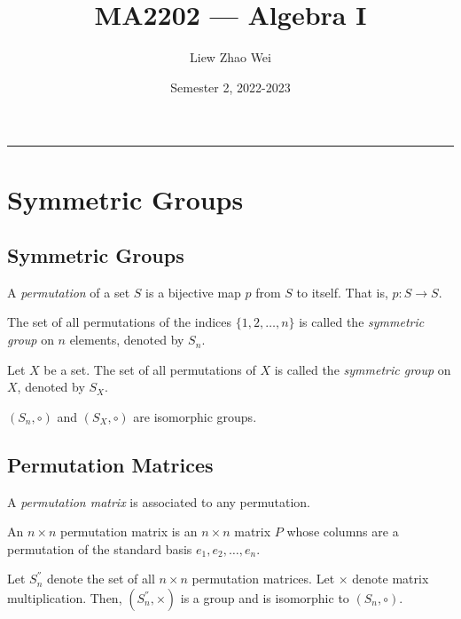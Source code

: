 \documentclass{article}
\title{MA2202 --- Algebra I}
\author{Liew Zhao Wei}
\date{Semester 2, 2022-2023}
\begin{document}
\maketitle
\hrule

\section{Symmetric Groups}

\subsection{Symmetric Groups}

\begin{definition}[Permutation]
  A \emph{permutation} of a set $S$ is a bijective map $p$ from $S$ to itself. That is, $p \colon S \to S$.
\end{definition}

\begin{definition}
  The set of all permutations of the indices $\{1, 2, \ldots, n\}$ is called the \emph{symmetric group} on $n$ elements, denoted by $S_n$.
\end{definition}

\begin{definition}
  Let $X$ be a set. The set of all permutations of $X$ is called the \emph{symmetric group} on $X$, denoted by $S_X$.
\end{definition}

\begin{proposition}
  $(S_n, \circ)$ and $(S_X, \circ)$ are isomorphic groups.
\end{proposition}

\subsection{Permutation Matrices}

A \emph{permutation matrix} is associated to any permutation.

\begin{definition}
  An $n \times n$ permutation matrix is an $n \times n$ matrix $P$ whose columns are a permutation of the standard basis $e_1, e_2, \ldots, e_n$.
\end{definition}

\begin{proposition}
  Let $S_n^{''}$ denote the set of all $n \times n$ permutation matrices. Let $\times$ denote matrix multiplication. Then, $(S_n^{''}, \times)$ is a group and is isomorphic to $(S_n, \circ)$.
\end{proposition}
\end{document}
